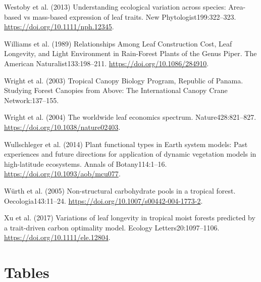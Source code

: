 \documentclass[
  12pt,
  letterpaper,
  DIV=11,
  numbers=noendperiod]{scrartcl}
\newlength{\cslhangindent}
\newenvironment{CSLReferences}[2] %
 {\begin{list}{}{%
  \setlength{\itemindent}{0pt}
  \setlength{\leftmargin}{0pt}
  \setlength{\parsep}{0pt}
  \ifodd #1
   \setlength{\leftmargin}{\cslhangindent}
   \setlength{\itemindent}{-1\cslhangindent}
  \fi
  \setlength{\itemsep}{#2\baselineskip}}}
 {\end{list}}
\begin{document}
\begin{CSLReferences}{1}{1}
Westoby et al. (2013) Understanding ecological variation across species:
{Area-based} vs mass-based expression of leaf traits. New
Phytologist199:322--323. \url{https://doi.org/10.1111/nph.12345}.

Williams et al. (1989) Relationships {Among Leaf Construction Cost},
{Leaf Longevity}, and {Light Environment} in {Rain-Forest Plants} of the
{Genus Piper}. The American Naturalist133:198--211.
\url{https://doi.org/10.1086/284910}.

Wright et al. (2003) Tropical {Canopy Biology Program}, {Republic} of
{Panama}. Studying {Forest Canopies} from {Above}: {The International
Canopy Crane Network}:137--155.

Wright et al. (2004) The worldwide leaf economics spectrum.
Nature428:821--827. \url{https://doi.org/10.1038/nature02403}.

Wullschleger et al. (2014) Plant functional types in {Earth} system
models: {Past} experiences and future directions for application of
dynamic vegetation models in high-latitude ecosystems. Annals of
Botany114:1--16. \url{https://doi.org/10.1093/aob/mcu077}.

Würth et al. (2005) Non-structural carbohydrate pools in a tropical
forest. Oecologia143:11--24.
\url{https://doi.org/10.1007/s00442-004-1773-2}.

Xu et al. (2017) Variations of leaf longevity in tropical moist forests
predicted by a trait-driven carbon optimality model. Ecology
Letters20:1097--1106. \url{https://doi.org/10.1111/ele.12804}.

\end{CSLReferences}

\newpage

\section{Tables}\label{tables}
\end{document}
